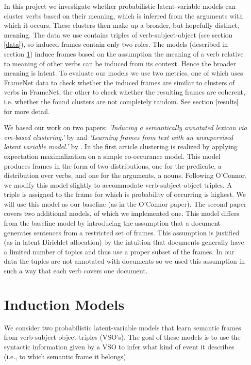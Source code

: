 \documentclass{article} %
\begin{document}
In this project we investigate whether probabilistic latent-variable models can cluster verbs based on their meaning, which is inferred from the arguments with which it occurs. These clusters then make up a broader, but hopefully distinct, meaning. The data we use contains triples of verb-subject-object (see section \ref{data}), so induced frames contain only two roles. The models (described in section \ref{models}) induce frames based on the assumption the meaning of a verb relative to meaning of other verbs can be induced from its context. Hence the broader meaning is latent. To evaluate our models we use two metrics, one of which uses FrameNet data to check whether the induced frames are similar to clusters of verbs in FrameNet, the other to check whether the resulting frames are coherent, i.e. whether the found clusters are not completely random. See section \ref{results} for more detail.

We based our work on two papers: \textit{`Inducing a semantically annotated lexicon via em-based clustering.'} by \citeauthor{rooth1999} and \textit{`Learning frames from text with an unsupervised latent variable model.'} by \citeauthor{oconnor2013}. In the first article clustering is realized by applying expectation maximalization on a simple co-occurance model. This model produces frames in the form of two distributions, one for the predicate, a distribution over verbs, and one for the arguments, a nouns. Following O'Connor, we modify this model slightly to accommodate verb-subject-object triples. A triple is assigned to the frame for which is probability of occurring is highest. We will use this model as our baseline (as in the O'Connor paper). The second paper covers two additional models, of which we implemented one. This model differs from the baseline model by introducing the assumption that a document generates sentences from a restricted set of frames. This assumption is justified (as in latent Dirichlet allocation) \cite{blei2003} by the intuition that documents generally have a limited number of topics and thus use a proper subset of the frames. In our data the tuples are not annotated with documents so we used this assumption in such a way that each verb covers one document.  


\section{Induction Models}
\label{models}
We consider two probabilistic latent-variable models that learn semantic frames
from verb-subject-object triples (VSO's).
The goal of these models is to use the syntactic information given by a VSO to
infer what kind of event it describes (i.e., to which semantic frame it belongs).
\end{document}
